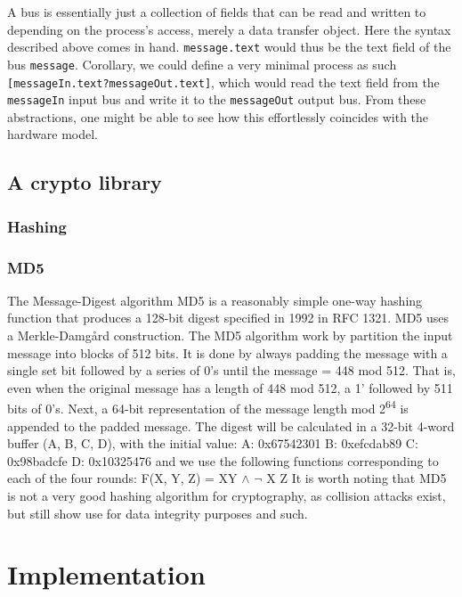\documentclass[a4paper]{article}
\begin{document}
A bus is essentially just a collection of fields that can be read and written to depending on the process's access, merely a data transfer object. Here the syntax described above comes in hand. \texttt{message.text} would thus be the text field of the bus \texttt{message}. Corollary, we could define a very minimal process as such \texttt{[messageIn.text?messageOut.text]}, which would read the text field from the \texttt{messageIn} input bus and write it to the \texttt{messageOut} output bus. From these abstractions, one might be able to see how this effortlessly coincides with the hardware model.
\subsection{A crypto library}
\label{sec:org60924af}

\subsubsection{Hashing}
\label{sec:orgca2643a}

\subsubsection{MD5}
\label{sec:org633dd3e}
The Message-Digest algorithm MD5 is a reasonably simple one-way hashing function that produces a 128-bit digest specified in 1992 in RFC 1321\cite{}. MD5 uses a Merkle-Damgård construction.
The MD5 algorithm work by partition the input message into blocks of 512 bits. It is done by always padding the message with a single set bit followed by a series of 0's until the message = 448 mod 512. That is, even when the original message has a length of 448 mod 512, a 1' followed by 511 bits of 0's.
Next, a 64-bit representation of the message length mod 2\textsuperscript{64} is appended to the padded message.
The digest will be calculated in a 32-bit 4-word buffer (A, B, C, D), with the initial value:
A: 0x67542301
B: 0xefcdab89
C: 0x98badcfe
D: 0x10325476
and we use the following functions corresponding to each of the four rounds:
F(X, Y, Z) = XY \(\wedge\) \(\neg{}\) X Z
It is worth noting that MD5 is not a very good hashing algorithm for cryptography, as collision attacks exist, but still show use for data integrity purposes and such.

\section{Implementation}
\label{sec:orgd80e8f6}
\end{document}
